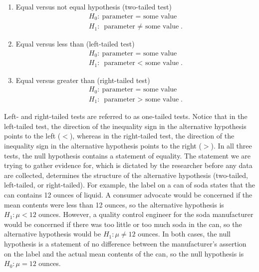 \documentclass{report}
\begin{document}
    \begin{enumerate}
        \item Equal versus not equal hypothesis (two-tailed test)
            \begin{align*}
                H_{0}:\ \text{parameter = some value} \\
                H_{1}:\ \text{parameter $\ne$ some value}
            .\end{align*}
        \item Equal versus less than (left-tailed test)
            \begin{align*}
                H_{0}:\ \text{parameter = some value} \\
                H_{1}:\ \text{parameter $<$ some value}
            .\end{align*}
        \item Equal versus greater than (right-tailed test)
            \begin{align*}
                H_{0}:\ \text{parameter = some value} \\
                H_{1}:\ \text{parameter $>$ some value}
            .\end{align*}
    \end{enumerate}
    \bigbreak \noindent 
    Left- and right-tailed tests are referred to as one-tailed tests. Notice that in the left-tailed test, the direction of the inequality sign in the alternative hypothesis points to the left ($<$), whereas in the right-tailed test, the direction of the inequality sign in the alternative hypothesis points to the right ($>$). In all three tests, the null hypothesis contains a statement of equality.
    \bigbreak \noindent 
    The statement we are trying to gather evidence for, which is dictated by the researcher before any data are collected, determines the structure of the alternative hypothesis (two-tailed, left-tailed, or right-tailed). For example, the label on a can of soda states that the can contains 12 ounces of liquid. A consumer advocate would be concerned if the mean contents were less than 12 ounces, so the alternative hypothesis is \(H_1: \mu < 12\) ounces. However, a quality control engineer for the soda manufacturer would be concerned if there was too little or too much soda in the can, so the alternative hypothesis would be \(H_1: \mu \neq 12\) ounces. In both cases, the null hypothesis is a statement of no difference between the manufacturer’s assertion on the label and the actual mean contents of the can, so the null hypothesis is \(H_0: \mu = 12\) ounces.
\end{document}
